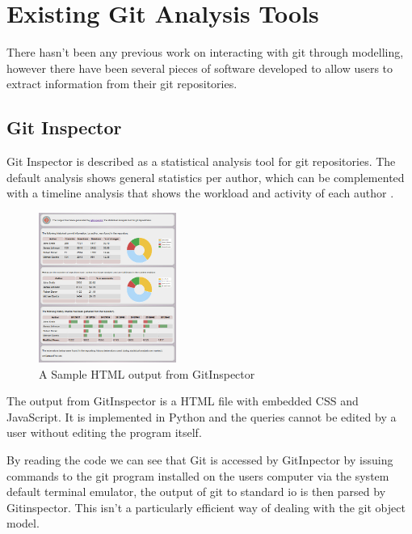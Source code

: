 \documentclass[11pt]{book}
\begin{document}
\section{Existing Git Analysis Tools}
There hasn't been any previous work on interacting with git through modelling, however there have been several pieces of software developed to allow users to extract information from their git repositories.

\subsection{Git Inspector}
Git Inspector is described as a statistical analysis tool for git repositories. The default analysis shows general statistics per author, which can be complemented with a timeline analysis that shows the workload and activity of each author \cite{gitinspector}.

\begin{figure}[h]
	\centering
	\includegraphics[width=0.4\textwidth]{images/gitinspector}
	\caption{A Sample HTML output from GitInspector \cite{gitinspector}}
	\label{fig:gitbranching}
\end{figure} 

The output from GitInspector is a HTML file with embedded CSS and JavaScript. It is implemented in Python and the queries cannot be edited by a user without editing the program itself.

By reading the code we can see that Git is accessed by GitInpector by issuing commands to the git program installed on the users computer via the system default terminal emulator, the output of git to standard io is then parsed by Gitinspector. This isn't a particularly efficient way of dealing with the git object model. %
\end{document}
